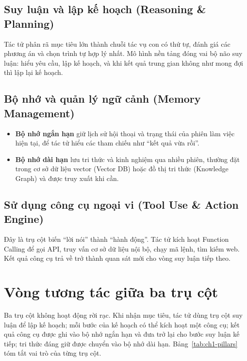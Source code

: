 \subsection{Suy luận và lập kế hoạch (Reasoning \& Planning)}
Tác tử phân rã mục tiêu lớn thành chuỗi tác vụ con có thứ tự, đánh giá các phương án và chọn trình tự hợp lý nhất. Mô
hình nền tảng đóng vai bộ não suy luận: hiểu yêu cầu, lập kế hoạch, và khi kết quả trung gian không như mong đợi thì lập
lại kế hoạch.

\subsection{Bộ nhớ và quản lý ngữ cảnh (Memory Management)}
\begin{itemize}
  \item \textbf{Bộ nhớ ngắn hạn} giữ lịch sử hội thoại và trạng thái của phiên làm việc hiện tại, để tác tử hiểu các tham
        chiếu như ``kết quả vừa rồi''.
  \item \textbf{Bộ nhớ dài hạn} lưu tri thức và kinh nghiệm qua nhiều phiên, thường đặt trong cơ sở dữ liệu vector
        (Vector DB) hoặc đồ thị tri thức (Knowledge Graph) và được truy xuất khi cần.
\end{itemize}

\subsection{Sử dụng công cụ ngoại vi (Tool Use \& Action Engine)}
Đây là trụ cột biến ``lời nói'' thành ``hành động''. Tác tử kích hoạt Function Calling để gọi API, truy vấn cơ sở dữ liệu
nội bộ, chạy mã lệnh, tìm kiếm web. Kết quả công cụ trả về trở thành quan sát mới cho vòng suy luận tiếp theo.


\section{Vòng tương tác giữa ba trụ cột}
Ba trụ cột không hoạt động rời rạc. Khi nhận mục tiêu, tác tử dùng trụ cột suy luận để lập kế hoạch; mỗi bước của kế
hoạch có thể kích hoạt một công cụ; kết quả công cụ được ghi vào bộ nhớ ngắn hạn và đưa trở lại cho bước suy luận kế
tiếp; tri thức đáng giữ được chuyển vào bộ nhớ dài hạn. Bảng~\ref{tab:ch1-pillars} tóm tắt vai trò của từng trụ cột.

